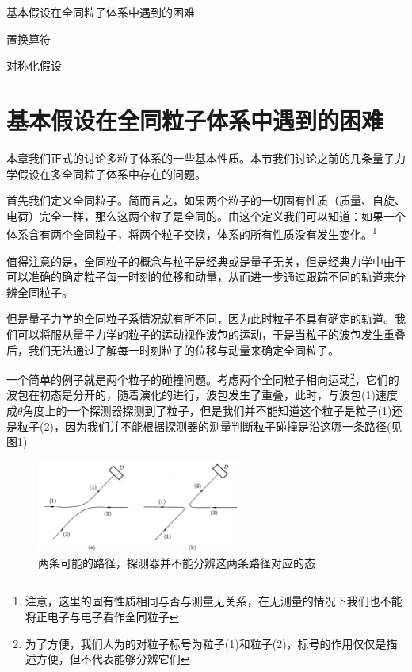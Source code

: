 \begin{introduction}
    \item 基本假设在全同粒子体系中遇到的困难
    \item 置换算符
    \item 对称化假设
    \item 
\end{introduction}
\section{基本假设在全同粒子体系中遇到的困难}
本章我们正式的讨论多粒子体系的一些基本性质。本节我们讨论之前的几条量子力学假设在多全同粒子体系中存在的问题。

首先我们定义全同粒子。简而言之，如果两个粒子的一切固有性质（质量、自旋、电荷）完全一样，那么这两个粒子是全同的。由这个定义我们可以知道：如果一个体系含有两个全同粒子，将两个粒子交换，体系的所有性质没有发生变化。\footnote{注意，这里的固有性质相同与否与测量无关系，在无测量的情况下我们也不能将正电子与电子看作全同粒子}

值得注意的是，全同粒子的概念与粒子是经典或是量子无关，但是经典力学中由于可以准确的确定粒子每一时刻的位移和动量，从而进一步通过跟踪不同的轨道来分辨全同粒子。

但是量子力学的全同粒子系情况就有所不同，因为此时粒子不具有确定的轨道。我们可以将服从量子力学的粒子的运动视作波包的运动，于是当粒子的波包发生重叠后，我们无法通过了解每一时刻粒子的位移与动量来确定全同粒子。

一个简单的例子就是两个粒子的碰撞问题。考虑两个全同粒子相向运动\footnote{为了方便，我们人为的对粒子标号为粒子(1)和粒子(2)，标号的作用仅仅是描述方便，但不代表能够分辨它们}，它们的波包在初态是分开的，随着演化的进行，波包发生了重叠，此时，与波包(1)速度成$\theta$角度上的一个探测器探测到了粒子，但是我们并不能知道这个粒子是粒子(1)还是粒子(2)，因为我们并不能根据探测器的测量判断粒子碰撞是沿这哪一条路径(见图\ref{fig:identicalparticles})
\begin{figure}[H]
    \centering
    \includegraphics[width=0.6\textwidth]{figure/identicalparticles.png}
    \caption{两条可能的路径，探测器并不能分辨这两条路径对应的态}
    \label{fig:identicalparticles}
\end{figure}

